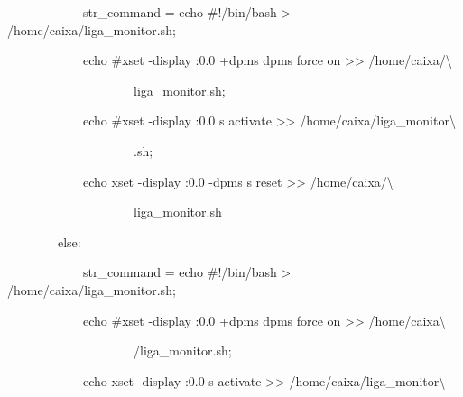 {\ttfamily\color[rgb]{0.10980392,0.10980392,0.10980392}
    \ \ \ \ \ \ \ \ \ \ \ \ str\_command = {\textquotedbl}{\textquotedbl}{\textquotedbl}echo
    {\textquotedbl}\#!/bin/bash{\textquotedbl} {\textgreater} /home/caixa/liga\_monitor.sh;}

{\ttfamily\color[rgb]{0.10980392,0.10980392,0.10980392}
    \ \ \ \ \ \ \ \ \ \ \ \ echo {\textquotedbl}\#xset -display :0.0 +dpms dpms force on{\textquotedbl}
    {\textgreater}{\textgreater} /home/caixa/{\textbackslash}}

{\ttfamily\color[rgb]{0.10980392,0.10980392,0.10980392}
    \ \ \ \ \ \ \ \ \ \ \ \ \ \ \ \ \ \ \ \ liga\_monitor.sh;}

{\ttfamily\color[rgb]{0.10980392,0.10980392,0.10980392}
    \ \ \ \ \ \ \ \ \ \ \ \ echo {\textquotedbl}\#xset -display :0.0 s activate{\textquotedbl} {\textgreater}{\textgreater}
    /home/caixa/liga\_monitor{\textbackslash}}

{\ttfamily\color[rgb]{0.10980392,0.10980392,0.10980392}
    \ \ \ \ \ \ \ \ \ \ \ \ \ \ \ \ \ \ \ \ .sh;}

{\ttfamily\color[rgb]{0.10980392,0.10980392,0.10980392}
    \ \ \ \ \ \ \ \ \ \ \ \ echo {\textquotedbl}xset -display :0.0 -dpms s reset{\textquotedbl} {\textgreater}{\textgreater}
    /home/caixa/{\textbackslash}}

{\ttfamily\color[rgb]{0.10980392,0.10980392,0.10980392}
    \ \ \ \ \ \ \ \ \ \ \ \ \ \ \ \ \ \ \ \ liga\_monitor.sh {\textquotedbl}{\textquotedbl}{\textquotedbl}}

{\ttfamily\color[rgb]{0.10980392,0.10980392,0.10980392}
    \ \ \ \ \ \ \ \ else:}

{\ttfamily\color[rgb]{0.10980392,0.10980392,0.10980392}
    \ \ \ \ \ \ \ \ \ \ \ \ str\_command = {\textquotedbl}{\textquotedbl}{\textquotedbl}echo
    {\textquotedbl}\#!/bin/bash{\textquotedbl} {\textgreater} /home/caixa/liga\_monitor.sh;}

{\ttfamily\color[rgb]{0.10980392,0.10980392,0.10980392}
    \ \ \ \ \ \ \ \ \ \ \ \ echo {\textquotedbl}\#xset -display :0.0 +dpms dpms force on{\textquotedbl}
    {\textgreater}{\textgreater} /home/caixa{\textbackslash}}

{\ttfamily\color[rgb]{0.10980392,0.10980392,0.10980392}
    \ \ \ \ \ \ \ \ \ \ \ \ \ \ \ \ \ \ \ \ /liga\_monitor.sh;}

{\ttfamily\color[rgb]{0.10980392,0.10980392,0.10980392}
    \ \ \ \ \ \ \ \ \ \ \ \ echo {\textquotedbl}xset -display :0.0 s activate{\textquotedbl} {\textgreater}{\textgreater}
    /home/caixa/liga\_monitor{\textbackslash}}

